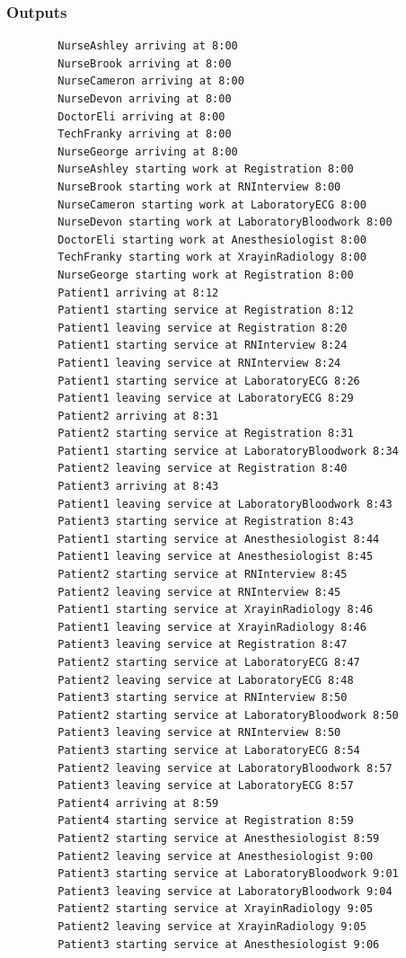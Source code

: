 \documentclass[12pt]{article}
\begin{document}
		\subsubsection{Outputs}
		\begin{verbatim}
		NurseAshley arriving at 8:00
		NurseBrook arriving at 8:00
		NurseCameron arriving at 8:00
		NurseDevon arriving at 8:00
		DoctorEli arriving at 8:00
		TechFranky arriving at 8:00
		NurseGeorge arriving at 8:00
		NurseAshley starting work at Registration 8:00
		NurseBrook starting work at RNInterview 8:00
		NurseCameron starting work at LaboratoryECG 8:00
		NurseDevon starting work at LaboratoryBloodwork 8:00
		DoctorEli starting work at Anesthesiologist 8:00
		TechFranky starting work at XrayinRadiology 8:00
		NurseGeorge starting work at Registration 8:00
		Patient1 arriving at 8:12
		Patient1 starting service at Registration 8:12
		Patient1 leaving service at Registration 8:20
		Patient1 starting service at RNInterview 8:24
		Patient1 leaving service at RNInterview 8:24
		Patient1 starting service at LaboratoryECG 8:26
		Patient1 leaving service at LaboratoryECG 8:29
		Patient2 arriving at 8:31
		Patient2 starting service at Registration 8:31
		Patient1 starting service at LaboratoryBloodwork 8:34
		Patient2 leaving service at Registration 8:40
		Patient3 arriving at 8:43
		Patient1 leaving service at LaboratoryBloodwork 8:43
		Patient3 starting service at Registration 8:43
		Patient1 starting service at Anesthesiologist 8:44
		Patient1 leaving service at Anesthesiologist 8:45
		Patient2 starting service at RNInterview 8:45
		Patient2 leaving service at RNInterview 8:45
		Patient1 starting service at XrayinRadiology 8:46
		Patient1 leaving service at XrayinRadiology 8:46
		Patient3 leaving service at Registration 8:47
		Patient2 starting service at LaboratoryECG 8:47
		Patient2 leaving service at LaboratoryECG 8:48
		Patient3 starting service at RNInterview 8:50
		Patient2 starting service at LaboratoryBloodwork 8:50
		Patient3 leaving service at RNInterview 8:50
		Patient3 starting service at LaboratoryECG 8:54
		Patient2 leaving service at LaboratoryBloodwork 8:57
		Patient3 leaving service at LaboratoryECG 8:57
		Patient4 arriving at 8:59
		Patient4 starting service at Registration 8:59
		Patient2 starting service at Anesthesiologist 8:59
		Patient2 leaving service at Anesthesiologist 9:00
		Patient3 starting service at LaboratoryBloodwork 9:01
		Patient3 leaving service at LaboratoryBloodwork 9:04
		Patient2 starting service at XrayinRadiology 9:05
		Patient2 leaving service at XrayinRadiology 9:05
		Patient3 starting service at Anesthesiologist 9:06

\end{verbatim}
\end{document}
